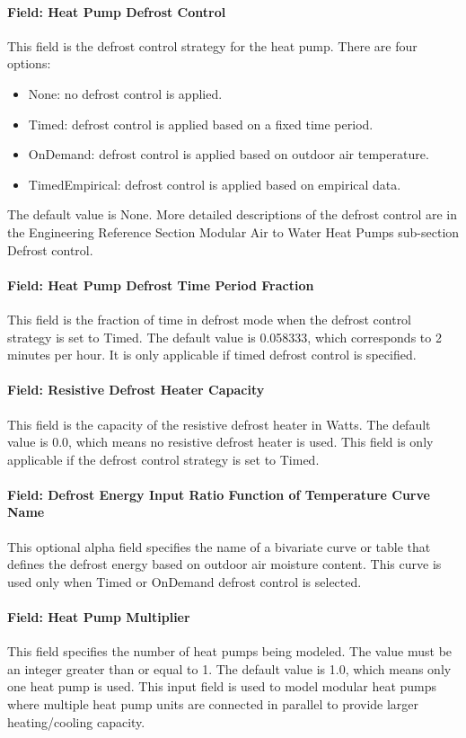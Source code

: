 \paragraph{Field: Heat Pump Defrost Control} This field is the defrost control
strategy for the heat pump. There are four options:
\begin{itemize} %
    \item None: no defrost control is applied.
    \item Timed: defrost control is applied based on a fixed time period.
    \item OnDemand: defrost control is applied based on outdoor air temperature.
    \item TimedEmpirical: defrost control is applied based on empirical data.
\end{itemize} The default value is None.
More detailed descriptions of the defrost control are in the Engineering Reference
Section Modular Air to Water Heat Pumps sub-section Defrost control.
\paragraph{Field: Heat Pump Defrost Time Period Fraction} This field is the
fraction of time in defrost mode when the defrost control strategy is set to
Timed. The default value is 0.058333, which corresponds to 2 minutes per hour.
It is only applicable if timed defrost control is specified.
\paragraph{Field: Resistive Defrost Heater Capacity} This field is the capacity
of the resistive defrost heater in Watts. The default value is 0.0, which means
no resistive defrost heater is used. This field is only applicable if the
defrost control strategy is set to Timed.
\paragraph{Field: Defrost Energy Input Ratio Function of Temperature Curve Name}
This optional alpha field specifies the name of a bivariate curve or table that
defines the defrost energy based on outdoor air moisture content. This curve is
used only when Timed or OnDemand defrost control is selected.
\paragraph{Field: Heat Pump Multiplier} This field specifies the number of heat
pumps being modeled. The value must be an integer greater than or equal to 1.
The default value is 1.0, which means only one heat pump is used. This input
field is used to model modular heat pumps where multiple heat pump units are
connected in parallel to provide larger heating/cooling capacity.
